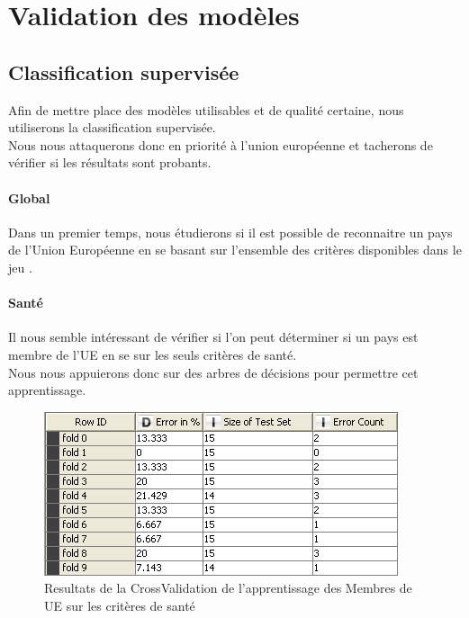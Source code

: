 \section{Validation des modèles}


\subsection{Classification supervisée}
Afin de mettre place des modèles utilisables et de qualité certaine, nous utiliserons la classification supervisée.\\
Nous nous attaquerons donc en priorité à l'union européenne et tacherons de vérifier si les résultats sont probants.

\paragraph{Global}
Dans un premier temps, nous étudierons si il est possible de reconnaitre un pays de l'Union Européenne en se basant sur l'ensemble des critères disponibles dans le jeu \jeuc .

\paragraph{Santé}
Il nous semble intéressant de vérifier si l'on peut déterminer si un pays est membre de l'UE en se sur les seuls critères de santé.\\
Nous nous appuierons donc sur des arbres de décisions pour permettre cet apprentissage.
\begin{figure}[H]
	\begin{center}
		\includegraphics[scale=0.5]{Image/ErrorRatesSante}
		\caption{Resultats de la CrossValidation de l'apprentissage des Membres de UE sur les critères de santé}
	\end{center}
\end{figure}


